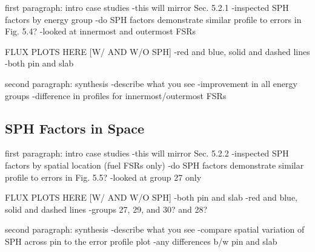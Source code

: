 first paragraph: intro case studies
-this will mirror Sec. 5.2.1
-inspected SPH factors by energy group
-do SPH factors demonstrate similar profile to errors in Fig. 5.4?
-looked at innermost and outermost FSRs

FLUX PLOTS HERE [W/ AND W/O SPH]
-red and blue, solid and dashed lines
-both pin and slab

second paragraph: synthesis
-describe what you see
-improvement in all energy groups
-difference in profiles for innermost/outermost FSRs

\subsection{SPH Factors in Space}
\label{subsubsec:chap5-sph-space}

first paragraph: intro case studies
-this will mirror Sec. 5.2.2
-inspected SPH factors by spatial location (fuel FSRs only)
-do SPH factors demonstrate similar profile to errors in Fig. 5.5?
-looked at group 27 only

FLUX PLOTS HERE [W/ AND W/O SPH]
-both pin and slab
-red and blue, solid and dashed lines
-groups 27, 29, and 30? and 28?

second paragraph: synthesis
-describe what you see
-compare spatial variation of SPH across pin to the error profile plot
-any differences b/w pin and slab





